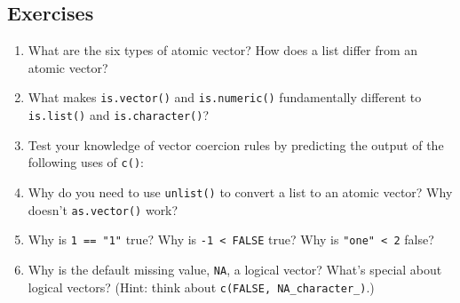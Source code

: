 \begin{Shaded}
\begin{Highlighting}[]

\StringTok{ }\StringTok{ } 
\end{Highlighting}
\end{Shaded}

\subsection{Exercises}

\begin{enumerate}
\def\labelenumi{\arabic{enumi}.}
\item
  What are the six types of atomic vector? How does a list differ from
  an atomic vector?
\item
  What makes \texttt{is.vector()} and \texttt{is.numeric()}
  fundamentally different to \texttt{is.list()} and
  \texttt{is.character()}?
\item
  Test your knowledge of vector coercion rules by predicting the output
  of the following uses of \texttt{c()}:

\begin{Shaded}
\begin{Highlighting}[]
\NormalTok{(}\NormalTok{, }\NormalTok{)}
\NormalTok{(}\NormalTok{, }\NormalTok{)}
\NormalTok{(}\NormalTok{(}\NormalTok{), }\NormalTok{)}
\NormalTok{(}
\end{Highlighting}
\end{Shaded}
\item
  Why do you need to use \texttt{unlist()} to convert a list to an
  atomic vector? Why doesn't \texttt{as.vector()} work?
\item
  Why is \texttt{1 == "1"} true? Why is \texttt{-1 \textless{} FALSE}
  true? Why is \texttt{"one" \textless{} 2} false?
\item
  Why is the default missing value, \texttt{NA}, a logical vector?
  What's special about logical vectors? (Hint: think about
  \texttt{c(FALSE, NA\_character\_)}.)
\end{enumerate}

